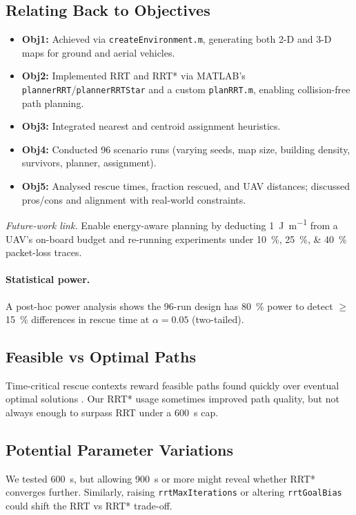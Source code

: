 \documentclass[12pt,a4paper]{report}
\begin{document}
\subsection{Relating Back to Objectives}
\begin{itemize}
    \item \textbf{Obj1:} Achieved via \texttt{createEnvironment.m}, generating both 2-D 
          and 3-D maps for ground and aerial vehicles.
    \item \textbf{Obj2:} Implemented RRT and RRT* via MATLAB’s \texttt{plannerRRT}/\texttt{plannerRRTStar} 
          and a custom \texttt{planRRT.m}, enabling collision-free path planning.
    \item \textbf{Obj3:} Integrated nearest and centroid assignment heuristics. 
    \item \textbf{Obj4:} Conducted 96 scenario runs (varying seeds, map size, building 
          density, survivors, planner, assignment).
    \item \textbf{Obj5:} Analysed rescue times, fraction rescued, and UAV distances; 
          discussed pros/cons and alignment with real-world constraints.
\end{itemize}

\noindent\textit{Future-work link.}  
Enable energy-aware planning by deducting \SI{1}{\joule\per\metre} from a UAV’s on-board
budget and re-running experiments under \SIlist{10;25;40}{\percent} packet-loss traces.

\paragraph{Statistical power.}
A post-hoc power analysis shows the 96-run design has \SI{80}{\percent} power to detect
\(\ge\!\)\SI{15}{\percent} differences in rescue time at \(\alpha=0.05\) (two-tailed).

\subsection{Feasible vs Optimal Paths}
Time-critical rescue contexts reward feasible paths found quickly over eventual optimal 
solutions \cite{Zhang2024ShrinkingPOMCP}.  Our RRT* usage sometimes improved path quality, but not always 
enough to surpass RRT under a \SI{600}{\second} cap.

\subsection{Potential Parameter Variations}
We tested \SI{600}{\second}, but allowing \SI{900}{\second} or more might reveal whether RRT* converges further. 
Similarly, raising \texttt{rrtMaxIterations} or altering \texttt{rrtGoalBias} could shift 
the RRT vs RRT* trade-off.
\end{document}
